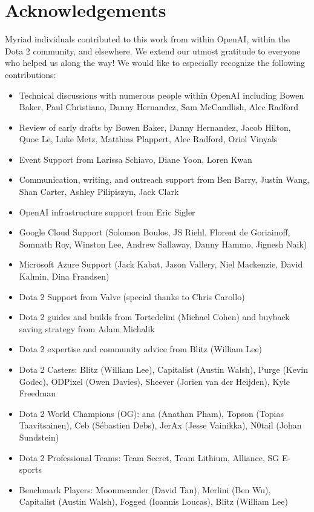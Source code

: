 \documentclass[11pt]{article}
\newcommand{\dota}{Dota 2\xspace}
\begin{document}
\section*{Acknowledgements}
Myriad individuals contributed to this work from within OpenAI, within the \dota community, and elsewhere. 
We extend our utmost gratitude to everyone who helped us along the way! 
We would like to especially recognize the following contributions:
\begin{itemize}
\item Technical discussions with numerous people within OpenAI including Bowen Baker, Paul Christiano, Danny Hernandez, Sam McCandlish, Alec Radford%
\item Review of early drafts by Bowen Baker, Danny Hernandez, Jacob Hilton, Quoc Le, Luke Metz, Matthias Plappert, Alec Radford, Oriol Vinyals 
\item Event Support from Larissa Schiavo, Diane Yoon, Loren Kwan%
\item Communication, writing, and outreach support from Ben Barry, Justin Wang, Shan Carter, Ashley Pilipiszyn, Jack Clark
\item OpenAI infrastructure support from Eric Sigler %
\item Google Cloud Support (Solomon Boulos, JS Riehl, Florent de Goriainoff, Somnath Roy, Winston Lee, Andrew Sallaway, Danny Hammo, Jignesh Naik)
\item Microsoft Azure Support (Jack Kabat, Jason Vallery, Niel Mackenzie, David Kalmin, Dina Frandsen)
\item \dota Support from Valve (special thanks to Chris Carollo)
\item \dota guides and builds from Tortedelini (Michael Cohen) and buyback saving strategy from Adam Michalik
\item \dota expertise and community advice from Blitz (William Lee)
\item \dota Casters: Blitz (William Lee), Capitalist (Austin Walsh), Purge (Kevin Godec), ODPixel (Owen Davies), Sheever (Jorien van der Heijden), Kyle Freedman
\item \dota World Champions (OG): ana (Anathan Pham), Topson (Topias Taavitsainen), Ceb (S\'{e}bastien Debs), JerAx (Jesse Vainikka), N0tail (Johan Sundstein)
\item \dota Professional Teams: Team Secret, Team Lithium, Alliance, SG E-sports
\item Benchmark Players: Moonmeander (David Tan), Merlini (Ben Wu), Capitalist (Austin Walsh), Fogged (Ioannis Loucas), Blitz (William Lee)

\end{itemize}
\end{document}
